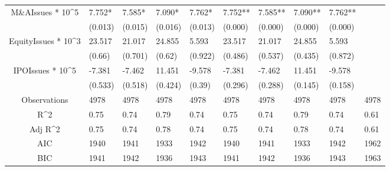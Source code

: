 \documentclass{article}
\begin{document}
\begin{table}[H]
\begin{tabular}{|clllllllll|}
  M\&AIssues * 10^5 & 7.752* & 7.585* & 7.090* & 7.762* & 7.752** & 7.585** & 7.090** & 7.762** &  \\ 
   & (0.013) & (0.015) & (0.016) & (0.013) & (0.000) & (0.000) & (0.000) & (0.000) &  \\ 
  EquityIssues * 10^3 & 23.517 & 21.017 & 24.855 & 5.593 & 23.517 & 21.017 & 24.855 & 5.593 &  \\ 
   & (0.66) & (0.701) & (0.62) & (0.922) & (0.486) & (0.537) & (0.435) & (0.872) &  \\ 
  IPOIssues * 10^5 & -7.381 & -7.462 & 11.451 & -9.578 & -7.381 & -7.462 & 11.451 & -9.578 &  \\ 
   & (0.533) & (0.518) & (0.424) & (0.39) & (0.296) & (0.288) & (0.145) & (0.158) &  \\ 
  \hline 
 Observations & 4978 & 4978 & 4978 & 4978 & 4978 & 4978 & 4978 & 4978 & 4978 \\ 
  R^2 & 0.75 & 0.74 & 0.79 & 0.74 & 0.75 & 0.74 & 0.79 & 0.74 & 0.61 \\ 
  Adj R^2 & 0.75 & 0.74 & 0.78 & 0.74 & 0.75 & 0.74 & 0.78 & 0.74 & 0.61 \\ 
  AIC & 1940 & 1941 & 1933 & 1942 & 1940 & 1941 & 1933 & 1942 & 1962 \\ 
  BIC & 1941 & 1942 & 1936 & 1943 & 1941 & 1942 & 1936 & 1943 & 1963 \\ 
   \hline
\end{tabular}
 
\end{table}
\end{document}
